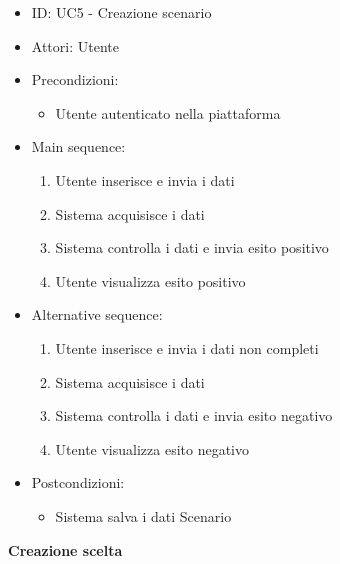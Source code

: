 \documentclass{article}
\begin{document}
\begin{itemize}[label = { }]
    \itemsep0px
    \item ID: UC5 - Creazione scenario
    \item Attori: Utente
    \item Precondizioni: 
        \begin{itemize}[label = {-}]
            \item Utente autenticato nella piattaforma
        \end{itemize}
    \item Main sequence: 
        \begin{enumerate}
            \item Utente inserisce e invia i dati
            \item Sistema acquisisce i dati
            \item Sistema controlla i dati e invia esito positivo
            \item Utente visualizza esito positivo
        \end{enumerate}
    \item Alternative sequence:
        \begin{enumerate}
            \item Utente inserisce e invia i dati non completi
            \item Sistema acquisisce i dati
            \item Sistema controlla i dati e invia esito negativo
            \item Utente visualizza esito negativo
        \end{enumerate}
    \item Postcondizioni: 
        \begin{itemize}[label = {-}]
            \item Sistema salva i dati Scenario
        \end{itemize}
\end{itemize}
\textbf{Creazione scelta}
\end{document}
